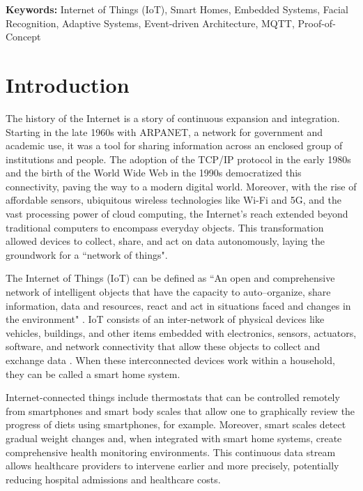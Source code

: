 \documentclass[12pt]{article}
\begin{document}
\textbf{Keywords:} Internet of Things (IoT), Smart Homes, Embedded Systems, Facial Recognition, Adaptive Systems, Event-driven Architecture, MQTT, Proof-of-Concept

\newpage
{}
\setcounter{page}{1}
\pagestyle{plain}

\section{Introduction}

The history of the Internet is a story of continuous expansion and integration. Starting in the late 1960s with ARPANET, a network for government and academic use, it was a tool for sharing information across an enclosed group of institutions and people. The adoption of the TCP/IP protocol in the early 1980s and the birth of the World Wide Web in the 1990s democratized this connectivity, paving the way to a modern digital world. Moreover, with the rise of affordable sensors, ubiquitous wireless technologies like Wi-Fi and 5G, and the vast processing power of cloud computing, the Internet's reach extended beyond traditional computers to encompass everyday objects. This transformation allowed devices to collect, share, and act on data autonomously, laying the groundwork for a ``network of things".  

The Internet of Things (IoT) can be defined as ``An open and comprehensive network of intelligent objects that have the capacity to auto–organize, share information, data and resources, react and act in situations faced and changes in the environment" \cite{somayya2015smart}. IoT consists of an inter-network of physical devices like vehicles, buildings, and other items embedded with electronics, sensors, actuators, software, and network connectivity that allow these objects to collect and exchange data \cite{mehra2019home}. When these interconnected devices work within a household, they can be called a smart home system.

Internet-connected things include thermostats that can be controlled remotely from smartphones and smart body scales that allow one to graphically review the progress of diets using smartphones, for example. Moreover, smart scales detect gradual weight changes and, when integrated with smart home systems, create comprehensive health monitoring environments. This continuous data stream allows healthcare providers to intervene earlier and more precisely, potentially reducing hospital admissions and healthcare costs.
\end{document}
